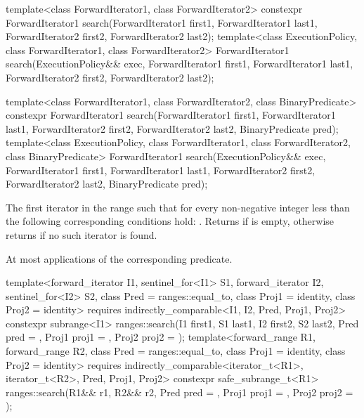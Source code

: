 %
\begin{itemdecl}
template<class ForwardIterator1, class ForwardIterator2>
  constexpr ForwardIterator1
    search(ForwardIterator1 first1, ForwardIterator1 last1,
           ForwardIterator2 first2, ForwardIterator2 last2);
template<class ExecutionPolicy, class ForwardIterator1, class ForwardIterator2>
  ForwardIterator1
    search(ExecutionPolicy&& exec,
           ForwardIterator1 first1, ForwardIterator1 last1,
           ForwardIterator2 first2, ForwardIterator2 last2);

template<class ForwardIterator1, class ForwardIterator2,
         class BinaryPredicate>
  constexpr ForwardIterator1
    search(ForwardIterator1 first1, ForwardIterator1 last1,
           ForwardIterator2 first2, ForwardIterator2 last2,
           BinaryPredicate pred);
template<class ExecutionPolicy, class ForwardIterator1, class ForwardIterator2,
         class BinaryPredicate>
  ForwardIterator1
    search(ExecutionPolicy&& exec,
           ForwardIterator1 first1, ForwardIterator1 last1,
           ForwardIterator2 first2, ForwardIterator2 last2,
           BinaryPredicate pred);
\end{itemdecl}

\begin{itemdescr}
\pnum
\returns
The first iterator  in the range 
such that
for every non-negative integer  less than 
the following corresponding conditions hold:
.
Returns  if  is empty,
otherwise returns  if no such iterator is found.

\pnum
\complexity
At most  applications
of the corresponding predicate.
\end{itemdescr}

%
\begin{itemdecl}
template<forward_iterator I1, sentinel_for<I1> S1, forward_iterator I2,
         sentinel_for<I2> S2, class Pred = ranges::equal_to,
         class Proj1 = identity, class Proj2 = identity>
  requires indirectly_comparable<I1, I2, Pred, Proj1, Proj2>
  constexpr subrange<I1>
    ranges::search(I1 first1, S1 last1, I2 first2, S2 last2, Pred pred = {},
                   Proj1 proj1 = {}, Proj2 proj2 = {});
template<forward_range R1, forward_range R2, class Pred = ranges::equal_to,
         class Proj1 = identity, class Proj2 = identity>
  requires indirectly_comparable<iterator_t<R1>, iterator_t<R2>, Pred, Proj1, Proj2>
  constexpr safe_subrange_t<R1>
    ranges::search(R1&& r1, R2&& r2, Pred pred = {},
                   Proj1 proj1 = {}, Proj2 proj2 = {});
\end{itemdecl}

